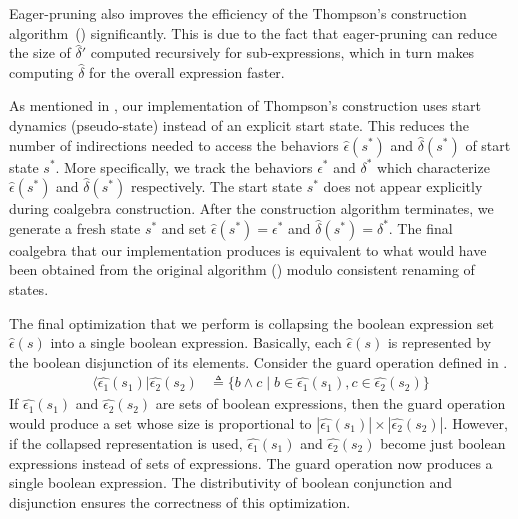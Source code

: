 \documentclass[conference]{IEEEtran}
\begin{document}
Eager-pruning also improves the efficiency of the Thompson's construction algorithm~() significantly. This is due to the fact that eager-pruning can reduce the size of \(\hat{\delta}'\) computed recursively for sub-expressions, which in turn makes computing \(\hat{\delta}\) for the overall expression faster.

As mentioned in , our implementation of Thompson's construction uses start dynamics (pseudo-state) instead of an explicit start state. This reduces the number of indirections needed to access the behaviors \(\hat{\epsilon}(s^*) \) and \(\hat{\delta}(s^*)\) of start state \(s^*\). More specifically, we track the behaviors \(\epsilon^*\) and \(\delta^*\) which characterize \(\hat{\epsilon}(s^*) \) and \(\hat{\delta}(s^*)\) respectively. The start state \(s^*\) does not appear explicitly during coalgebra construction. After the construction algorithm terminates, we generate a fresh state \(s^*\) and set \(\hat{\epsilon}(s^*) = \epsilon^*\) and \(\hat{\delta}(s^*) = \delta^*\). The final coalgebra that our implementation produces is equivalent to what would have been obtained from the original algorithm () modulo consistent renaming of states.

The final optimization that we perform is collapsing the boolean expression set \(\hat{\epsilon}(s)\) into a single boolean expression. Basically, each \(\hat{\epsilon}(s)\) is represented by the boolean disjunction of its elements. Consider the guard operation defined in .
\begin{align*}
    ⟨\hat{\epsilon_1}(s_1)|\hat{\epsilon_2}(s_2) & ≜ \{b ∧ c ∣ b ∈ \hat{\epsilon_1}(s_1), c ∈ \hat{\epsilon_2}(s_2)\}
\end{align*}
If \(\hat{\epsilon_1}(s_1)\) and \(\hat{\epsilon_2}(s_2)\) are sets of boolean expressions, then the guard operation would produce a set whose size is proportional to \(|\hat{\epsilon_1}(s_1)| \times |\hat{\epsilon_2}(s_2)|\). However, if the collapsed representation is used, \(\hat{\epsilon_1}(s_1)\) and \(\hat{\epsilon_2}(s_2)\) become just boolean expressions instead of sets of expressions. The guard operation now produces a single boolean expression. The distributivity of boolean conjunction and disjunction ensures the correctness of this optimization.
\end{document}
